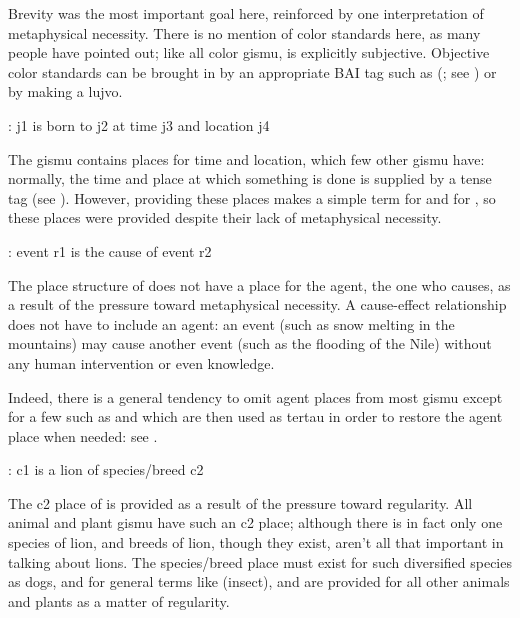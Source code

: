 Brevity was the most important goal here, reinforced by one
    interpretation of metaphysical necessity. There is no mention
    of color standards here, as many people have pointed out; like
    all color gismu,  is explicitly subjective. Objective
    color standards can be brought in by an appropriate BAI tag
    such as  (; see ) or by making a lujvo.
\begin{example}
: j1 is born to j2 at time j3 and location j4
\end{example}

The gismu  contains places for time and location,
    which few other gismu have: normally, the time and place at
    which something is done is supplied by a tense tag (see ). However, providing these
    places makes  a simple term for  and
     for , so these places were
    provided despite their lack of metaphysical necessity.
\begin{example}
: event r1 is the cause of event r2
\end{example}

The place structure of  does not have a place for the
    agent, the one who causes, as a result of the pressure toward
    metaphysical necessity. A cause-effect relationship does not
    have to include an agent: an event (such as snow melting in the
    mountains) may cause another event (such as the flooding of the
    Nile) without any human intervention or even knowledge. 

Indeed, there is a general tendency to omit agent places
    from most gismu except for a few such as  and
     which are then used as tertau in order to restore the
    agent place when needed: see .
\begin{example}
: c1 is a lion of species/breed c2
\end{example}

The c2 place of  is provided as a result of the
    pressure toward regularity. All animal and plant gismu have
    such an c2 place; although there is in fact only one species of
    lion, and breeds of lion, though they exist, aren't all that
    important in talking about lions. The species/breed place must
    exist for such diversified species as dogs, and for general
    terms like  (insect), and are provided for all other
    animals and plants as a matter of regularity. 

